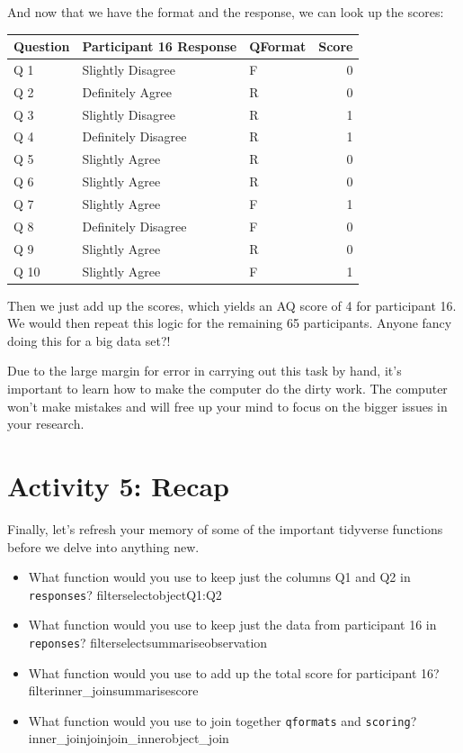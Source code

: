 \documentclass[
  oneside]{book}
\providecommand{\tightlist}{%
  \setlength{\itemsep}{0pt}\setlength{\parskip}{0pt}}
\begin{document}
And now that we have the format and the response, we can look up the scores:

\begin{tabular}{l|l|l|r}
\hline
Question & Participant 16 Response & QFormat & Score\\
\hline
Q 1 & Slightly Disagree & F & 0\\
\hline
Q 2 & Definitely Agree & R & 0\\
\hline
Q 3 & Slightly Disagree & R & 1\\
\hline
Q 4 & Definitely Disagree & R & 1\\
\hline
Q 5 & Slightly Agree & R & 0\\
\hline
Q 6 & Slightly Agree & R & 0\\
\hline
Q 7 & Slightly Agree & F & 1\\
\hline
Q 8 & Definitely Disagree & F & 0\\
\hline
Q 9 & Slightly Agree & R & 0\\
\hline
Q 10 & Slightly Agree & F & 1\\
\hline
\end{tabular}

Then we just add up the scores, which yields an AQ score of 4 for participant 16. We would then repeat this logic for the remaining 65 participants. Anyone fancy doing this for a big data set?!

Due to the large margin for error in carrying out this task by hand, it's important to learn how to make the computer do the dirty work. The computer won't make mistakes and will free up your mind to focus on the bigger issues in your research.

\hypertarget{activity-5-recap}{%
\section{Activity 5: Recap}\label{activity-5-recap}}

Finally, let's refresh your memory of some of the important tidyverse functions before we delve into anything new.

\begin{itemize}
\tightlist
\item
  What function would you use to keep just the columns Q1 and Q2 in \texttt{responses}? filterselectobjectQ1:Q2
\item
  What function would you use to keep just the data from participant 16 in \texttt{reponses}? filterselectsummariseobservation
\item
  What function would you use to add up the total score for participant 16? filterinner\_joinsummarisescore
\item
  What function would you use to join together \texttt{qformats} and \texttt{scoring}? inner\_joinjoinjoin\_innerobject\_join
\end{itemize}
\end{document}
